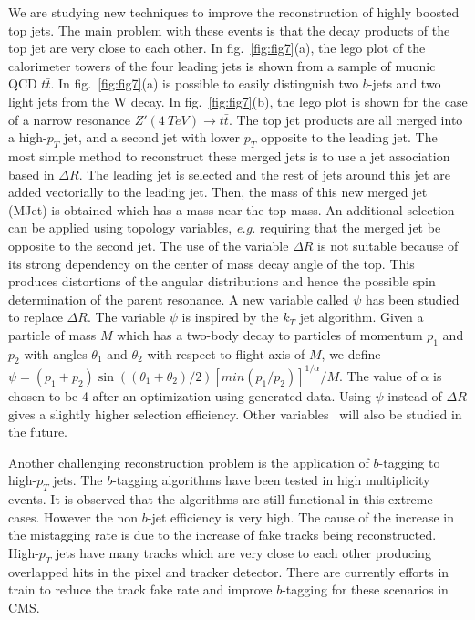 \documentclass{cimento}
\begin{document}
We are studying new techniques to improve the reconstruction of highly boosted top jets. The 
main problem with these events is that the decay products of the top jet are very close to each other.
In fig.~\ref{fig:fig7}(a), the lego plot of the calorimeter towers of the
four leading jets is shown from a sample of muonic QCD $t\bar{t}$. In fig.~\ref{fig:fig7}(a) is possible to 
easily distinguish two $b$-jets and two light jets from the W decay. In fig.~\ref{fig:fig7}(b),
the lego plot is shown for the case of a narrow resonance $Z'(4~TeV)\rightarrow t\bar{t}$.
The top jet products are all merged into a high-$p_T$ jet, and a second jet with lower $p_T$ opposite to the
leading jet. The most simple method to reconstruct these merged jets is to use a jet 
association based in $\Delta R$. The leading jet is selected and the rest of jets around this
jet are added vectorially to the leading jet. Then, the mass of this new merged jet (MJet) is obtained which
has a mass near the top mass. An additional selection can be applied using topology variables, {\it e.g.} requiring
that the merged jet be opposite to the second jet. The use of the variable $\Delta R$ is not
suitable because of its strong dependency on the center of mass decay angle of the top. This produces
distortions of the angular distributions and hence the possible spin determination of the parent resonance. A new
variable called $\psi$ has been studied to replace $\Delta R$. The variable $\psi$ is inspired by
the $k_T$ jet algorithm. Given a particle of mass $M$ which has a
two-body decay to particles of momentum $p_1$ and $p_2$ with angles $\theta_1$ and $\theta_2$ with
respect to flight axis of $M$, we define $\psi=(p_1+p_2)\sin((\theta_1+\theta_2)/2)[{min}(p_1/p_2)]^{1/\alpha}/M$.
The value of $\alpha$ is chosen to be 4 after an optimization using generated data. Using
$\psi$ instead of $\Delta R$ gives a slightly higher selection efficiency. Other variables~\cite{ref:other}
will also be studied in the future.

Another challenging reconstruction problem is the application of $b$-tagging to high-$p_T$ jets.
The $b$-tagging algorithms have been tested in high multiplicity events. It is observed
that the algorithms are still functional in this extreme cases. However the non $b$-jet efficiency
is very high. The cause of the increase in the mistagging rate is due
to the increase of fake tracks being reconstructed. High-$p_T$ jets have many tracks which are very close to each other
producing overlapped hits in the pixel and tracker detector. There are currently efforts in train to reduce
the track fake rate and improve $b$-tagging for these scenarios in CMS. 
\end{document}
